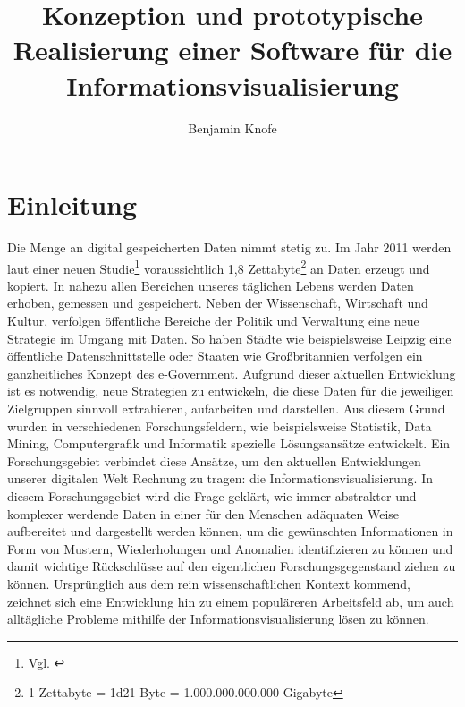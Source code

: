 \documentclass[a4paper, 12pt, DIV=calc, version=first, pdftex, headsepline, footsepline, bibtotocnumbered, liststotocnumbered]{scrreprt}
\begin{document}
\title{Konzeption und prototypische Realisierung einer Software für die Informationsvisualisierung}
\author{Benjamin Knofe}
\subject{Diplomarbeit}
\publishers{Hochschule für Technik, Wirtschaft und Kultur Leipzig}
\dedication{Dank an \\ Christina Sanko, Pyry Jahkola, Ted Mosby, Sarah Walter,
Stephan Keller, Professor Dr.-Ing. Robert Müller, Philip Whitfield, Johannes Knofe, René Zschoch}
\maketitle
\tableofcontents

\chapter{Einleitung}
\label{cha:Einleitung}
Die Menge an digital gespeicherten Daten nimmt stetig zu. Im Jahr 2011 werden laut einer neuen
Studie\footnote{Vgl. \citep{EMC}} voraussichtlich 1,8 Zettabyte\footnote{1 Zettabyte = \num{1d21}
Byte = 1.000.000.000.000 Gigabyte} an Daten erzeugt und kopiert. In nahezu allen Bereichen unseres
täglichen Lebens werden Daten erhoben, gemessen und gespeichert. Neben der Wissenschaft, Wirtschaft
und Kultur, verfolgen öffentliche Bereiche der Politik und Verwaltung eine neue Strategie im Umgang
mit Daten. So haben Städte wie beispielsweise Leipzig eine öffentliche Datenschnittstelle oder
Staaten wie Großbritannien verfolgen ein ganzheitliches Konzept des e-Government. Aufgrund dieser
aktuellen Entwicklung ist es notwendig, neue Strategien zu entwickeln, die diese Daten
für die jeweiligen Zielgruppen sinnvoll extrahieren, aufarbeiten und darstellen. Aus diesem
Grund wurden in verschiedenen Forschungsfeldern, wie beispielsweise Statistik, Data Mining,
Computergrafik und Informatik spezielle Lösungsansätze entwickelt. Ein Forschungsgebiet verbindet diese
Ansätze, um den aktuellen Entwicklungen unserer digitalen Welt Rechnung zu tragen: die Informationsvisualisierung.
In diesem Forschungsgebiet wird die Frage geklärt, wie immer abstrakter und komplexer werdende Daten
in einer für den Menschen adäquaten Weise aufbereitet und dargestellt werden können, um die gewünschten
Informationen in Form von Mustern, Wiederholungen und Anomalien identifizieren zu können und damit wichtige
Rückschlüsse auf den eigentlichen Forschungsgegenstand ziehen zu können. Ursprünglich aus dem rein
wissenschaftlichen Kontext kommend, zeichnet sich eine Entwicklung hin zu einem populäreren Arbeitsfeld ab,
um auch alltägliche Probleme mithilfe der Informationsvisualisierung lösen zu können.
\end{document}
